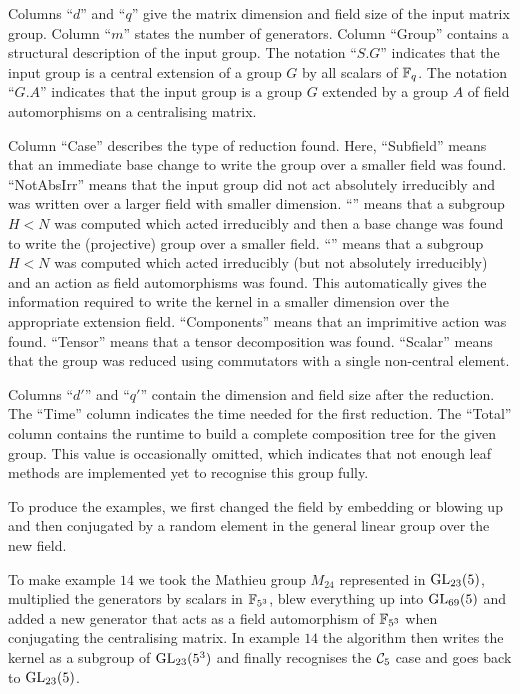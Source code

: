 Columns ``$d$'' and ``$q$'' give the matrix dimension
and field size of the input matrix group. Column
 ``$m$'' states the number of generators.
Column ``Group'' contains a structural description of the input
group. The notation ``$S.G$''  indicates
that the input group is a central extension of a group $G$ by all scalars 
of $\mathbb{F}_q$. The notation ``$G.A$'' 
indicates that the input group is a group $G$ extended by
 a group $A$ of field automorphisms on a centralising matrix.


Column ``Case''
describes the type of reduction found. Here,
``Subfield'' means that an immediate base change to write the group
over a smaller field was found. ``NotAbsIrr'' means that the input
group did not act absolutely irreducibly and was
written over a larger field with smaller dimension.
``'' means that a subgroup $H < N$ was computed which acted
irreducibly and then a base change was found to write the (projective)
group over a smaller field. ``'' means that a subgroup $H < N$ was
computed which acted irreducibly (but not absolutely irreducibly) and
an action as field automorphisms was found. This automatically gives the information required to write the kernel in a smaller dimension over the appropriate extension field. 
``Components'' means that an imprimitive action 
 was found. ``Tensor'' means that a tensor
decomposition was found. ``Scalar'' means that the group was
reduced using commutators with a single non-central element.

Columns ``$d'$'' and ``$q'$'' contain the dimension and
field size after the reduction. The ``Time'' column
indicates the time needed for the first reduction. The  ``Total''
column contains the runtime to build a complete composition
tree for the given group. This value is occasionally omitted, which 
indicates that not enough leaf methods are implemented yet to
recognise this group  fully.

To produce the examples, we first changed the field by embedding
or blowing up and then conjugated by a random element in the general
linear group over the new field.

To make example  $14$ we took the Mathieu group $M_{24}$ represented
in $\GL_{23}(5)$, multiplied the generators by scalars in $\mathbb{F}_{5^3}$,
blew everything up into $\GL_{69}(5)$ and added a new generator
that acts as a field automorphism of $\mathbb{F}_{5^3}$ when conjugating the centralising matrix.
In example $14$ the algorithm then
writes the kernel as a subgroup of $\GL_{23}(5^3)$ and finally 
recognises the $\mathcal{C}_{5}$ case and goes back to $\GL_{23}(5)$.


